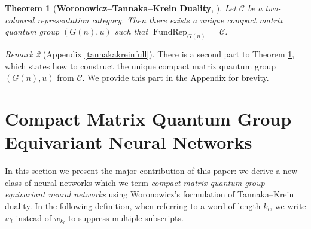 \documentclass{article}
\DeclareMathOperator{\FundRep}{FundRep}
\theoremstyle{plain}
\newtheorem{theorem}{Theorem}[section]
\theoremstyle{definition}
\theoremstyle{remark}
\newtheorem{remark}[theorem]{Remark}
\begin{document}
\begin{theorem}[\textbf{Woronowicz--Tannaka--Krein Duality}, \cite{woronowicz1988}]
	\label{tannakakrein}
	Let $\mathcal{C}$ be a two-coloured representation category.
	Then there exists a unique compact matrix quantum group $(G(n), u)$ 
	such that $\FundRep_{G(n)} = \mathcal{C}$.
\end{theorem}

\begin{remark}[Appendix \ref{tannakakreinfull}] \label{woronremark}
	There is a second part to Theorem \ref{tannakakrein}, which states
	how to construct the unique compact matrix quantum group $(G(n), u)$
	from $\mathcal{C}$. We provide this part in the Appendix 
	for brevity.
\end{remark}


\section{Compact Matrix Quantum Group Equivariant Neural Networks}
\label{CMQGNNs}

In this section we present the major contribution of this paper: 
we derive a new class of neural networks
which we term \textit{compact matrix quantum group equivariant neural networks}
using Woronowicz's formulation of Tannaka--Krein duality.
In the following definition, when referring to a word of length $k_l$, 
we write $w_l$ instead of $w_{k_l}$ to suppress multiple subscripts.
\end{document}
